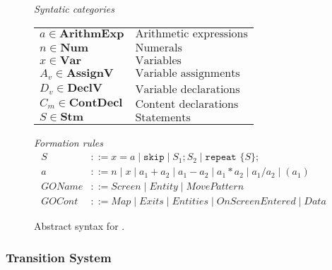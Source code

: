 \begin{figure}[htbp]
	\centering
	\textit{Syntatic categories}
	\vspace{4mm}


	\begin{tabular}{l l}
		$a \in \textbf{ArithmExp}$ & $\text{Arithmetic expressions}$ \\ 
		$n \in \textbf{Num}$ & $\text{Numerals}$ \\
		$x \in \textbf{Var}$ & $\text{Variables}$ \\
		$A_v \in \textbf{AssignV}$ & $\text{Variable assignments}$ \\
		$D_v \in \textbf{DeclV}$ & $\text{Variable declarations}$ \\
		$C_m \in \textbf{ContDecl}$ & $\text{Content declarations}$ \\
		$S \in \textbf{Stm}$ & $\text{Statements}$
	\end{tabular}

	\vspace{4mm}
	\textit{Formation rules}
	\begin{align*}
		S&::=x=a\mid \texttt{skip}\mid S_1;S_2\mid \texttt{repeat }\{S\}; \\
		a&::=n\mid x\mid a_1+a_2\mid a_1-a_2\mid a_1*a_2\mid a_1/a_2\mid (a_1) \\
		GOName&::= \textit{Screen} \mid \textit{Entity} \mid \textit{MovePattern} \\
		GOCont&::= \textit{Map} \mid \textit{Exits} \mid \textit{Entities} \mid \textit{OnScreenEntered} \mid \textit{Data}
	\end{align*}

	\caption{Abstract syntax for \dazel{}.}
	\label{fig:AbstractSyntax}
\end{figure}

\subsubsection*{Transition System}

